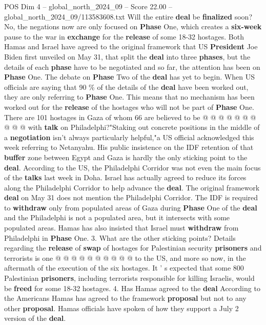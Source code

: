 \begin{textsample}{POS Dim 4 – global\_north\_2024\_09 – Score 22.00 – global\_north\_2024\_09/113583608.txt}
Will the entire \textbf{deal} be \textbf{finalized} soon?
No, the negations now are only focused on \textbf{Phase} One, which creates a \textbf{six-week} pause to the war in \textbf{exchange} for the \textbf{release} of some 18-32 hostages.
Both Hamas and Israel have agreed to the original framework that US \textbf{President} Joe Biden first unveiled on May 31, that split the \textbf{deal} into three \textbf{phases}, but the details of each \textbf{phase} have to be negotiated and so far, the attention has been on \textbf{Phase} One.
The debate on \textbf{Phase} Two of the \textbf{deal} has yet to begin.
When US officials are saying that 90 \% of the details of the \textbf{deal} have been worked out, they are only referring to \textbf{Phase} One.
This means that no mechanism has been worked out for the \textbf{release} of the hostages who will not be part of \textbf{Phase} One.
There are 101 hostages in Gaza of whom 66 are believed to be @ @ @ @ @ @ @ @ @ @ with \textbf{talk} on Philadelphi?"Staking out concrete positions in the middle of a \textbf{negotiation} isn't always particularly helpful,"a US official acknowledged this week referring to Netanyahu.
His public insistence on the IDF retention of that \textbf{buffer} zone between Egypt and Gaza is hardly the only sticking point to the \textbf{deal}.
According to the US, the Philadelphi Corridor was not even the main focus of the \textbf{talks} last week in Doha.
Israel has actually agreed to reduce its forces along the Philadelphi Corridor to help advance the \textbf{deal}.
The original framework \textbf{deal} on May 31 does not mention the Philadelphi Corridor.
The IDF is required to \textbf{withdraw} only from populated areas of Gaza during \textbf{Phase} One of the \textbf{deal} and the Philadelphi is not a populated area, but it intersects with some populated areas.
Hamas has also insisted that Israel must \textbf{withdraw} from Philadelphi in \textbf{Phase} One. 3.
What are the other sticking points?
Details regarding the \textbf{release} of \textbf{swap} of hostages for Palestinian security \textbf{prisoners} and terrorists is one @ @ @ @ @ @ @ @ @ @ to the US, and more so now, in the aftermath of the execution of the six hostages.
It ' s expected that some 800 Palestinian \textbf{prisoners}, including terrorists responsible for killing Israelis, would be \textbf{freed} for some 18-32 hostages. 4.
Has Hamas agreed to the \textbf{deal} According to the Americans Hamas has agreed to the framework \textbf{proposal} but not to any other \textbf{proposal}.
Hamas officials have spoken of how they support a July 2 version of the \textbf{deal}.

\end{textsample}
